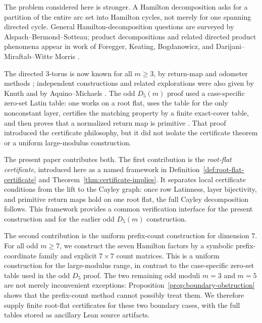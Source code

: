 \documentclass[11pt]{article}
\theoremstyle{definition}
\begin{document}
The problem considered here is stronger.  A Hamilton decomposition asks for a partition of the entire
arc set into Hamilton cycles, not merely for one spanning directed cycle.  General Hamilton-decomposition
questions are surveyed by Alspach--Bermond--Sotteau; product decompositions and related directed product
phenomena appear in work of Foregger, Keating, Bogdanowicz, and Darijani--Miraftab--Witte Morris
\cite{AlspachBermondSotteau,Foregger,Keating,Bogdanowicz2017,Bogdanowicz2020,DarijaniMiraftabMorris}.

The directed \(3\)-torus is now known for all \(m\ge3\), by return-map and odometer methods
\cite{ParkD3}; independent constructions and related explorations were also given by Knuth and by
Aquino--Michaels \cite{KnuthClaude,AquinoMichaels}.  The odd \(D_5(m)\) proof used a case-specific zero-set Latin table: one works on a root flat, uses the table for the only nonconstant
layer, certifies the matching property by a finite exact-cover table, and then proves that a normalized
return map is primitive \cite{ParkD5Odd}.  That proof introduced the certificate philosophy, but
it did not isolate the certificate theorem or a uniform large-modulus construction.

The present paper contributes both.  The first contribution is the \emph{root-flat certificate}, introduced here as a named framework in Definition~\ref{def:root-flat-certificate} and Theorem~\ref{thm:certificate-implies}.  It separates local certificate conditions from the lift to the Cayley graph: once row Latinness, layer bijectivity, and primitive return maps hold on one root flat, the full Cayley decomposition follows.  This framework provides a common verification interface for the present construction and for the earlier odd \(D_5(m)\) construction.

The second contribution is the uniform prefix-count construction for dimension \(7\).  For all
odd \(m\ge7\), we construct the seven Hamilton factors by a symbolic prefix-coordinate family and
explicit \(7\times7\) count matrices.  This is a uniform construction for the large-modulus range, in contrast to the case-specific zero-set table used in the odd \(D_5\) proof.  The two remaining odd moduli \(m=3\)
and \(m=5\) are not merely inconvenient exceptions: Proposition~\ref{prop:boundary-obstruction}
shows that the prefix-count method cannot possibly treat them.  We therefore supply finite
root-flat certificates for these two boundary cases, with the full tables stored as ancillary Lean
source artifacts.
\end{document}
